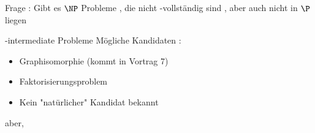 

\begin{frame}
	Frage : Gibt es $\NP$  Probleme , die nicht \NP -vollständig sind , aber auch nicht in $\P$  liegen
\end{frame}
\begin{frame}{\NP -intermediate Probleme}
	Mögliche Kandidaten :
	\begin{itemize}
	\item Graphisomorphie (kommt in Vortrag 7)
	\item Faktorisierungsproblem
	\item Kein "natürlicher" Kandidat bekannt
	\end{itemize}
	
	aber,
\end{frame}

